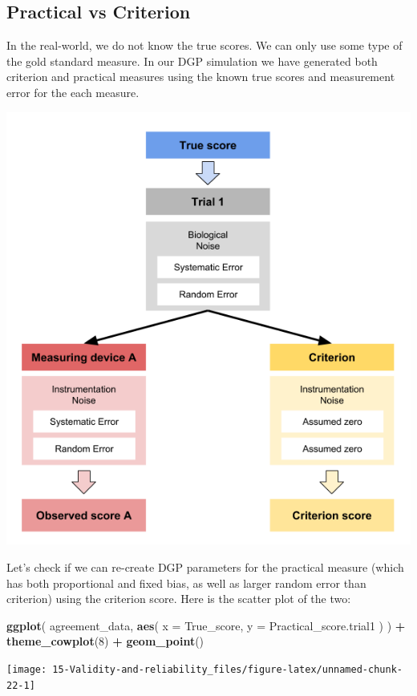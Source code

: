\documentclass[
]{book}
\newenvironment{Shaded}{\begin{snugshade}}{\end{snugshade}}
\newcommand{\DataTypeTok}[1]{\textcolor[rgb]{0.13,0.29,0.53}{#1}}
\newcommand{\DecValTok}[1]{\textcolor[rgb]{0.00,0.00,0.81}{#1}}
\newcommand{\KeywordTok}[1]{\textcolor[rgb]{0.13,0.29,0.53}{\textbf{#1}}}
\newcommand{\NormalTok}[1]{#1}
\newcommand{\OperatorTok}[1]{\textcolor[rgb]{0.81,0.36,0.00}{\textbf{#1}}}
\newcommand{\StringTok}[1]{\textcolor[rgb]{0.31,0.60,0.02}{#1}}
\begin{document}
\hypertarget{practical-vs-criterion}{%
\subsection{Practical vs Criterion}\label{practical-vs-criterion}}

In the real-world, we do not know the true scores. We can only use some type of the gold standard measure. In our DGP simulation we have generated both criterion and practical measures using the known true scores and measurement error for the each measure.

\begin{center}\includegraphics[width=0.5\linewidth]{figures/validity-analysis} \end{center}

Let's check if we can re-create DGP parameters for the practical measure (which has both proportional and fixed bias, as well as larger random error than criterion) using the criterion score. Here is the scatter plot of the two:

\begin{Shaded}
\begin{Highlighting}[]
\KeywordTok{ggplot}\NormalTok{(}
\NormalTok{  agreement\_data,}
  \KeywordTok{aes}\NormalTok{(}
    \DataTypeTok{x =}\NormalTok{ True\_score,}
    \DataTypeTok{y =}\NormalTok{ Practical\_score.trial1}
\NormalTok{  )}
\NormalTok{) }\OperatorTok{+}
\StringTok{  }\KeywordTok{theme\_cowplot}\NormalTok{(}\DecValTok{8}\NormalTok{) }\OperatorTok{+}
\StringTok{  }\KeywordTok{geom\_point}\NormalTok{()}
\end{Highlighting}
\end{Shaded}

\begin{center}\texttt{[image: 15-Validity-and-reliability\_files/figure-latex/unnamed-chunk-22-1]} \end{center}
\end{document}
